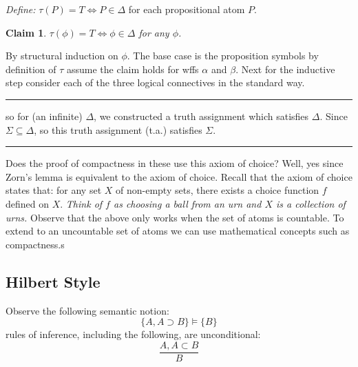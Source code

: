 \documentclass[twoside]{article}
\newtheorem{claim}[theorem]{Claim}
\newenvironment{proof}{{\bf Proof:}}{\hfill\rule{2mm}{2mm}}
\begin{document}
\begin{proof}
\textit{Define:} $\tau(P) = T \iff P \in \Delta$ for each propositional atom $P$.

\begin{claim}
$\tau(\phi) = T \iff \phi \in \Delta$ for any $\phi$.
\end{claim}
\begin{proof}
By structural induction on $\phi$. The base case is the proposition symbols by definition of $\tau$  assume the claim holds for wffs $\alpha$ and $\beta$. Next for the inductive step consider each of the three logical connectives in the standard way.  
\end{proof}

so for (an infinite) $\Delta$, we constructed a truth assignment which satisfies $\Delta$. Since $\Sigma \subseteq \Delta$, so this truth assignment (t.a.) satisfies $\Sigma$. 

\end{proof}

Does the proof of compactness in these use this axiom of choice? Well, yes since Zorn's lemma is equivalent to the axiom of choice. Recall that the axiom of choice states that: for any set $X$ of non-empty sets, there exists a choice function $f$ defined on $X$. \emph{Think of $f$ as choosing a ball from an urn and $X$ is a collection of urns.} Observe that the above only works when the set of atoms is countable. To extend to an uncountable set of atoms we can use mathematical concepts such as compactness.s

\subsection{Hilbert Style}
Observe the following semantic notion:
\[\{A, A \supset B\} \vDash \{B\}\]
rules of inference, including the following, are unconditional:
\[\frac{A, A \subset B}{B}\]
\end{document}

